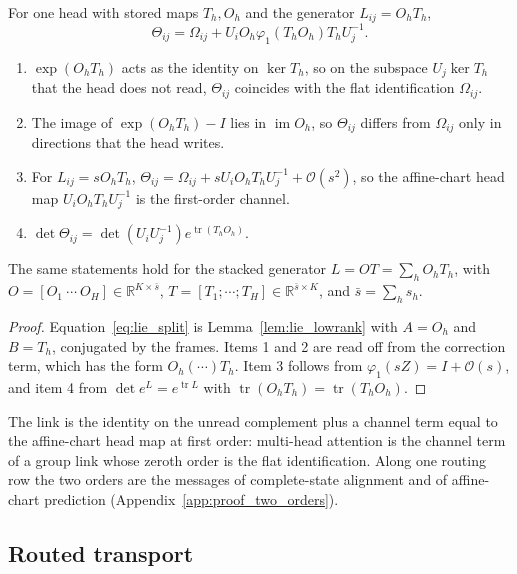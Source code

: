 \documentclass[twoside,11pt]{article}
\begin{document}
\begin{proposition}
\label{prop:lie_split}
For one head with stored maps $T_h,O_h$ and the generator $L_{ij}=O_hT_h$,
\begin{equation}
\Theta_{ij}=\Omega_{ij}+U_iO_h\varphi_1(T_hO_h)T_hU_j^{-1}.
\label{eq:lie_split}
\end{equation}
\begin{enumerate}
\item $\exp(O_hT_h)$ acts as the identity on $\ker T_h$, so on the subspace $U_j\ker T_h$ that the head does not read, $\Theta_{ij}$ coincides with the flat identification $\Omega_{ij}$.
\item The image of $\exp(O_hT_h)-I$ lies in $\operatorname{im}O_h$, so $\Theta_{ij}$ differs from $\Omega_{ij}$ only in directions that the head writes.
\item For $L_{ij}=sO_hT_h$, $\Theta_{ij}=\Omega_{ij}+sU_iO_hT_hU_j^{-1}+\mathcal O(s^2)$, so the affine-chart head map $U_iO_hT_hU_j^{-1}$ is the first-order channel.
\item $\det\Theta_{ij}=\det(U_iU_j^{-1})e^{\operatorname{tr}(T_hO_h)}$.
\end{enumerate}
The same statements hold for the stacked generator $L=OT=\sum_hO_hT_h$, with $O=[O_1\ \cdots\ O_H]\in\mathbb R^{K\times\bar s}$, $T=[T_1;\cdots;T_H]\in\mathbb R^{\bar s\times K}$, and $\bar s=\sum_hs_h$.
\end{proposition}
\begin{proof}
Equation~\eqref{eq:lie_split} is Lemma~\ref{lem:lie_lowrank} with $A=O_h$ and $B=T_h$, conjugated by the frames. Items 1 and 2 are read off from the correction term, which has the form $O_h(\cdots)T_h$. Item 3 follows from $\varphi_1(sZ)=I+\mathcal O(s)$, and item 4 from $\det e^{L}=e^{\operatorname{tr}L}$ with $\operatorname{tr}(O_hT_h)=\operatorname{tr}(T_hO_h)$.
\end{proof}

The link is the identity on the unread complement plus a channel term equal to the affine-chart head map at first order: multi-head attention is the channel term of a group link whose zeroth order is the flat identification. Along one routing row the two orders are the messages of complete-state alignment and of affine-chart prediction (Appendix~\ref{app:proof_two_orders}).

\subsection{Routed transport}
\label{sec:lie_aggregation}
\label{sec:lie_orders}
\end{document}
